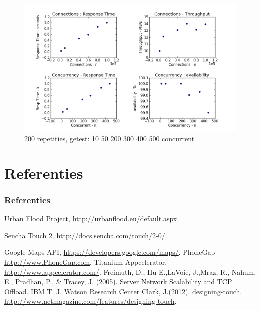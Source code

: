 \documentclass[10pt,a4paper]{beamer}
\begin{document}
\begin{frame}
\begin{figure}
\includegraphics[scale=0.4]{siege_200r.png}
\caption{200 repetities, getest: 10 50 200 300 400 500 concurrent}
\end{figure}
\end{frame}

\section{Referenties}
\begin{frame}
\begin{thebibliography}{9}
\frametitle{Referenties}
  Urban Flood Project,
  \url{http://urbanflood.eu/default.aspx}.

	Sencha Touch 2.
	\url{http://docs.sencha.com/touch/2-0/}.

	Google Maps API,
	\url{https://developers.google.com/maps/}.
	PhoneGap
	\url{http://www.PhoneGap.com}.
	Titanium Appcelerator,
	\url{http://www.appcelerator.com/}.
	Freimuth, D., Hu E.,LaVoie,  J.,Mraz, R., Nahum, E., Pradhan, P., \& Tracey, J. (2005). Server Network Scalability and TCP Offload.
	IBM T. J. Watson Research Center
	Clark,  J.(2012). designing-touch. \url{http://www.netmagazine.com/features/designing-touch}.
\end{thebibliography}
\end{frame}
\begin{frame}


\end{frame}
\end{document}
